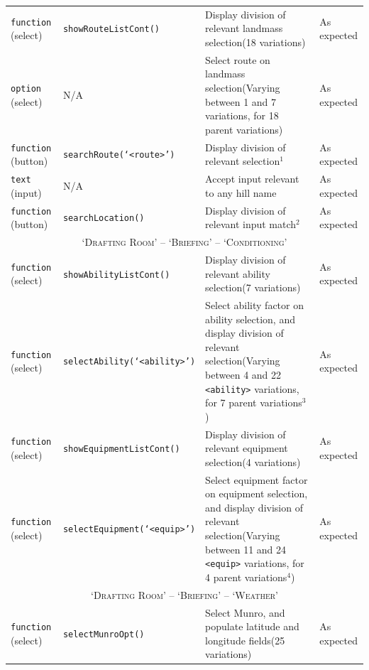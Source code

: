 \documentclass[11pt, english]{article}
\begin{document}
\begin{center}
\begin{longtable}{p{2.5cm}p{3.5cm}p{5cm}p{1.75cm}}
		\hline
		\texttt{function} (select) & \texttt{showRouteListCont()} & Display division of relevant landmass selection\newline (18 variations) & As expected\\
		\texttt{option} (select) & N/A & Select route on landmass selection\newline (Varying between 1 and 7 variations, for 18 parent variations) & As expected\\
		\texttt{function} (button) & \texttt{searchRoute(`<route>')} & Display division of relevant selection$^{1}$ & As expected\\
		\texttt{text} (input) & N/A & Accept input relevant to any hill name & As expected\\
		\texttt{function} (button) & \texttt{searchLocation()} & Display division of relevant input match$^{2}$ & As expected\\
		\hline
		\multicolumn{4}{c}{\textsc{`Drafting Room' -- `Briefing' -- `Conditioning'}}\\
		\hline
		\texttt{function} (select) & \texttt{showAbilityListCont()} & Display division of relevant ability selection\newline (7 variations) & As expected\\
		\texttt{function} (select) & \texttt{selectAbility(`<ability>')} & Select ability factor on ability selection, and display division of relevant selection\newline (Varying between 4 and 22 \texttt{<ability>} variations, for 7 parent variations$^{3}$) & As expected\\
		\texttt{function} (select) & \texttt{showEquipmentListCont()} & Display division of relevant equipment selection\newline (4 variations) & As expected\\
		\texttt{function} (select) & \texttt{selectEquipment(`<equip>')} & Select equipment factor on equipment selection, and display division of relevant selection\newline (Varying between 11 and 24 \texttt{<equip>} variations, for 4 parent variations$^{4}$) & As expected\\
		\hline
		\multicolumn{4}{c}{\textsc{`Drafting Room' -- `Briefing' -- `Weather'}}\\
		\hline
		\texttt{function} (select) & \texttt{selectMunroOpt()} & Select Munro, and populate latitude and longitude fields\newline (25 variations) & As expected\\

\end{longtable}
\end{center}
\end{document}
